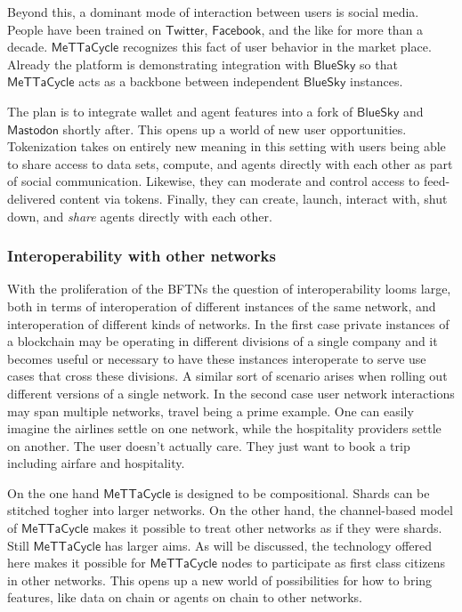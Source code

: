 \documentclass{article}
\newcommand{\MC}{\mathsf{MeTTaCycle}}
\begin{document}
Beyond this, a dominant mode of interaction between users is social
media. People have been trained on $\mathsf{Twitter}$,
$\mathsf{Facebook}$, and the like for more than a decade. $\MC$
recognizes this fact of user behavior in the market place. Already the
platform is demonstrating integration with $\mathsf{BlueSky}$ so that
$\MC$ acts as a backbone between independent $\mathsf{BlueSky}$
instances.

The plan is to integrate wallet and agent features into a fork of
$\mathsf{BlueSky}$ and $\mathsf{Mastodon}$ shortly after. This opens
up a world of new user opportunities. Tokenization takes on entirely
new meaning in this setting with users being able to share access to
data sets, compute, and agents directly with each other as part of
social communication. Likewise, they can moderate and control access
to feed-delivered content via tokens. Finally, they can create,
launch, interact with, shut down, and \emph{share} agents directly
with each other.

\subsubsection{Interoperability with other networks}
With the proliferation of the BFTNs the question of interoperability
looms large, both in terms of interoperation of different instances of
the same network, and interoperation of different kinds of
networks. In the first case private instances of a blockchain may be
operating in different divisions of a single company and it becomes
useful or necessary to have these instances interoperate to serve use
cases that cross these divisions. A similar sort of scenario arises
when rolling out different versions of a single network. In the second
case user network interactions may span multiple networks, travel
being a prime example. One can easily imagine the airlines settle on
one network, while the hospitality providers settle on another. The
user doesn't actually care. They just want to book a trip including
airfare and hospitality.

On the one hand $\MC$ is designed to be compositional. Shards can be
stitched togher into larger networks. On the other hand, the
channel-based model of $\MC$ makes it possible to treat other networks
as if they were shards. Still $\MC$ has larger aims. As will be
discussed, the technology offered here makes it possible for $\MC$
nodes to participate as first class citizens in other networks. This
opens up a new world of possibilities for how to bring features, like
data on chain or agents on chain to other networks.
\end{document}
